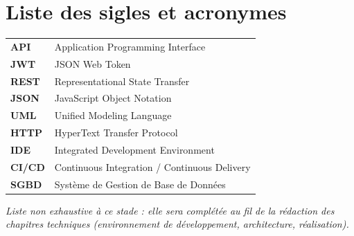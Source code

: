 \documentclass[12pt,a4paper]{report}
\newcommand{\fixfrenchcaptions}{%
  \renewcommand{\figurename}{Figure}%
  \renewcommand{\tablename}{Tableau}%
}
\begin{document}
\fixfrenchcaptions

\tableofcontents

\listoffigures
{}

\listoftables
{}

\chapter*{Liste des sigles et acronymes}

\begin{longtable}{@{}p{}p{}@{}}
\textbf{API} & Application Programming Interface \\
\textbf{JWT} & JSON Web Token \\
\textbf{REST} & Representational State Transfer \\
\textbf{JSON} & JavaScript Object Notation \\
\textbf{UML} & Unified Modeling Language \\
\textbf{HTTP} & HyperText Transfer Protocol \\
\textbf{IDE} & Integrated Development Environment \\
\textbf{CI/CD} & Continuous Integration / Continuous Delivery \\
\textbf{SGBD} & Système de Gestion de Base de Données \\
\end{longtable}

\textit{\textcolor{greytext}{\small Liste non exhaustive à ce stade : elle sera complétée au fil de la rédaction des chapitres techniques (environnement de développement, architecture, réalisation).}}

\clearpage
{}
\setcounter{page}{1}

\end{document}
